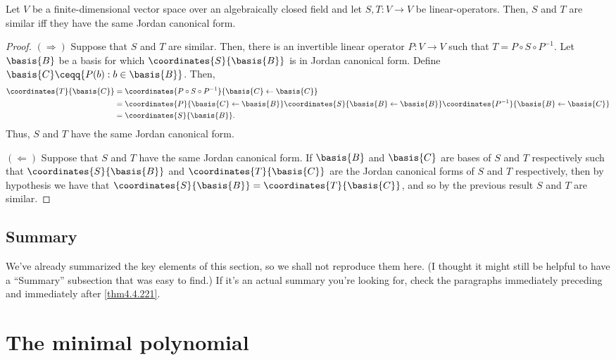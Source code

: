 \begin{thm}{}{}
	Let $V$ be a finite-dimensional vector space over an algebraically closed field and let $S,T\colon V\rightarrow V$ be linear-operators.  Then, $S$ and $T$ are similar iff they have the same Jordan canonical form.
	\begin{proof}
		$(\Rightarrow )$ Suppose that $S$ and $T$ are similar.  Then, there is an invertible linear operator $P\colon V\rightarrow V$ such that $T=P\circ S\circ P^{-1}$.  Let $\basis{B}$ be a basis for which $\coordinates{S}{\basis{B}}$ is in Jordan canonical form.  Define $\basis{C}\ceqq \{ P(b):b\in \basis{B}\}$.  Then,
		\begin{equation}
			\begin{split}
				\coordinates{T}{\basis{C}} & =\coordinates{P\circ S\circ P^{-1}}{\basis{C}\leftarrow \basis{C}} \\
				& =\coordinates{P}{\basis{C}\leftarrow \basis{B}}\coordinates{S}{\basis{B}\leftarrow \basis{B}}\coordinates{P^{-1}}{\basis{B}\leftarrow \basis{C}} \\
				& =\coordinates{S}{\basis{B}}.
			\end{split}
		\end{equation}
		Thus, $S$ and $T$ have the same Jordan canonical form.
		
		\blni
		$(\Leftarrow )$ Suppose that $S$ and $T$ have the same Jordan canonical form.  If $\basis{B}$ and $\basis{C}$ are bases of $S$ and $T$ respectively such that $\coordinates{S}{\basis{B}}$ and $\coordinates{T}{\basis{C}}$ are the Jordan canonical forms of $S$ and $T$ respectively, then by hypothesis we have that $\coordinates{S}{\basis{B}}=\coordinates{T}{\basis{C}}$, and so by the previous result $S$ and $T$ are similar.
	\end{proof}
\end{thm}

\subsection{Summary}

We've already summarized the key elements of this section, so we shall not reproduce them here.  (I thought it might still be helpful to have a ``Summary'' subsection that was easy to find.)  If it's an actual summary you're looking for, check the paragraphs immediately preceding and immediately after \cref{thm4.4.221}.

\section{The minimal polynomial}

